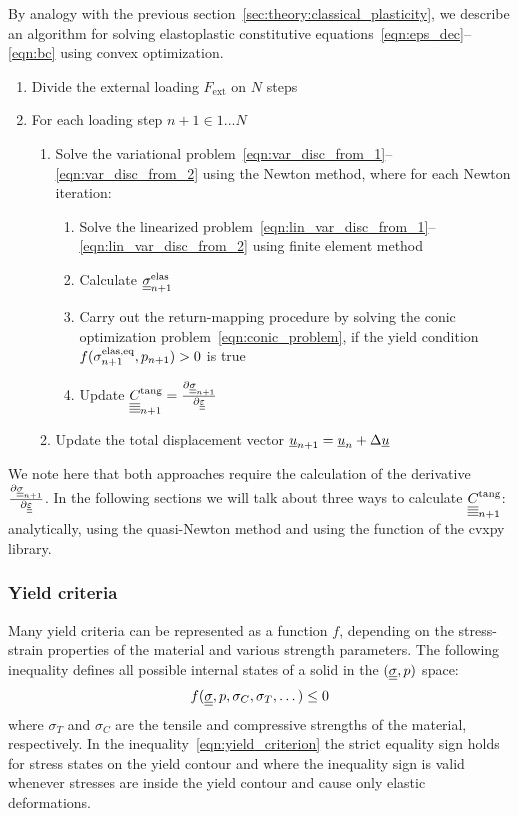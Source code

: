\documentclass[12pt]{article}
\begin{document}
By analogy with the previous section~\ref{sec:theory:classical_plasticity}, we describe an algorithm for solving elastoplastic constitutive equations~\eqref{eqn:eps_dec}--\eqref{eqn:bc} using convex optimization.
\begin{enumerate}
    \item Divide the external loading $F_\text{ext}$ on $N$ steps 
    \item For each loading step $n+1 \in {1 \dots N}$
    \begin{enumerate}
        \item Solve the variational problem~\eqref{eqn:var_disc_from_1}--\eqref{eqn:var_disc_from_2} using the Newton method, where for each Newton iteration:
        \begin{enumerate}
            \item Solve the linearized problem~\eqref{eqn:lin_var_disc_from_1}--\eqref{eqn:lin_var_disc_from_2} using finite element method
            \item Calculate $\underline{\underline{\sigma}}_{n+1}^{\text{elas}}$ 
            \item Carry out the return-mapping procedure by solving the conic optimization problem~\eqref{eqn:conic_problem}, if the yield condition $f(\sigma_{n+1}^\text{elas,eq}, p_{n+1}) > 0$ is true
            \item Update $\underline{\underline{\underline{\underline{C_{}}}}}^\text{tang}_{n+1} = \frac{\partial \underline{\underline{\sigma}}_{n+1}}{\partial\underline{\underline{\varepsilon}}}$
        \end{enumerate}
        \item Update the total displacement vector $\underline{u}_{n+1} = \underline{u}_n + \Delta\underline{u}$
    \end{enumerate}
\end{enumerate}

We note here that both approaches require the calculation of the derivative $\frac{\partial\underline{\underline{\sigma}}_{n+1}}{\partial\underline{\underline{\varepsilon}}}$. In the following sections we will talk about three ways to calculate $\underline{\underline{\underline{\underline{C_{}}}}}^\text{tang}_{n+1}$: analytically, using the quasi-Newton method and using the  function of the cvxpy library.

\subsubsection{Yield criteria}

Many yield criteria can be represented as a function $f$, depending on the stress-strain properties of the material and various strength parameters. The following inequality defines all possible internal states of a solid in the $(\underline{\underline{\sigma}}, p)$ space:
\begin{equation}\label{eqn:yield_criterion}
    f(\underline{\underline{\sigma}}, p, \sigma_C, \sigma_T, \dots) \leq 0
\end{equation}
where $\sigma_T$ and $\sigma_C$ are the tensile and compressive strengths of the material, respectively. In the inequality~\eqref{eqn:yield_criterion} the strict equality sign holds for stress states on the yield contour and where the inequality sign is valid whenever stresses are inside the yield contour and cause only elastic deformations.
\end{document}
